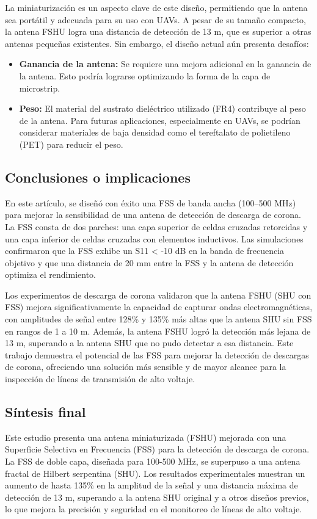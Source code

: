 \documentclass[11pt,a4paper]{article}
\begin{document}
La miniaturización es un aspecto clave de este diseño, permitiendo que la antena sea portátil y adecuada para su uso con UAVs. A pesar de su tamaño compacto, la antena FSHU logra una distancia de detección de 13 m, que es superior a otras antenas pequeñas existentes. Sin embargo, el diseño actual aún presenta desafíos:
\begin{itemize}
    \item \textbf{Ganancia de la antena:} Se requiere una mejora adicional en la ganancia de la antena. Esto podría lograrse optimizando la forma de la capa de microstrip.
    \item \textbf{Peso:} El material del sustrato dieléctrico utilizado (FR4) contribuye al peso de la antena. Para futuras aplicaciones, especialmente en UAVs, se podrían considerar materiales de baja densidad como el tereftalato de polietileno (PET) para reducir el peso.
\end{itemize}

\subsection*{Conclusiones o implicaciones}

En este artículo, se diseñó con éxito una FSS de banda ancha (100–500 MHz) para mejorar la sensibilidad de una antena de detección de descarga de corona. La FSS consta de dos parches: una capa superior de celdas cruzadas retorcidas y una capa inferior de celdas cruzadas con elementos inductivos. Las simulaciones confirmaron que la FSS exhibe un S11 < -10 dB en la banda de frecuencia objetivo y que una distancia de 20 mm entre la FSS y la antena de detección optimiza el rendimiento.

Los experimentos de descarga de corona validaron que la antena FSHU (SHU con FSS) mejora significativamente la capacidad de capturar ondas electromagnéticas, con amplitudes de señal entre 128\% y 135\% más altas que la antena SHU sin FSS en rangos de 1 a 10 m. Además, la antena FSHU logró la detección más lejana de 13 m, superando a la antena SHU que no pudo detectar a esa distancia. Este trabajo demuestra el potencial de las FSS para mejorar la detección de descargas de corona, ofreciendo una solución más sensible y de mayor alcance para la inspección de líneas de transmisión de alto voltaje.

\subsection*{Síntesis final}
Este estudio presenta una antena miniaturizada (FSHU) mejorada con una Superficie Selectiva en Frecuencia (FSS) para la detección de descarga de corona. La FSS de doble capa, diseñada para 100-500 MHz, se superpuso a una antena fractal de Hilbert serpentina (SHU). Los resultados experimentales muestran un aumento de hasta 135\% en la amplitud de la señal y una distancia máxima de detección de 13 m, superando a la antena SHU original y a otros diseños previos, lo que mejora la precisión y seguridad en el monitoreo de líneas de alto voltaje.
\end{document}
